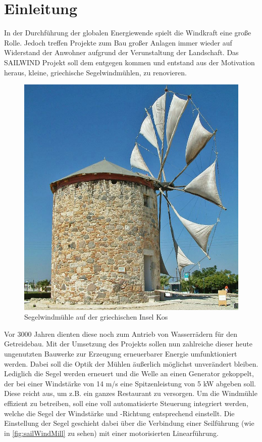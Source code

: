 \section{Einleitung}
In der Durchführung der globalen Energiewende spielt die Windkraft eine große Rolle. Jedoch treffen Projekte zum Bau großer Anlagen immer wieder auf Widerstand der Anwohner aufgrund der Verunstaltung der Landschaft. Das SAILWIND Projekt soll dem entgegen kommen und entstand aus der Motivation heraus, kleine, griechische Segelwindmühlen, zu renovieren. 
\begin{figure}[H]
	\centering
	\includegraphics[width=0.6\linewidth]{images/Sailwind/greekSailWindMill.jpg}
	\caption[Segelwindmühle auf der griechischen Insel Kos]{Segelwindmühle auf der griechischen Insel Kos \protect\cite{windMill}}
	\label{fig:sailWindMill}
\end{figure}
\noindent
Vor 3000 Jahren dienten diese noch zum Antrieb von Wasserrädern für den Getreidebau. Mit der Umsetzung des Projekts sollen nun zahlreiche dieser heute ungenutzten Bauwerke zur Erzeugung erneuerbarer Energie umfunktioniert werden. Dabei soll die Optik der Mühlen äußerlich möglichst unverändert bleiben. Lediglich die Segel werden erneuert und die Welle an einen Generator gekoppelt, der bei einer Windstärke von 14 m/s eine Spitzenleistung von 5 kW abgeben soll. Diese reicht aus, um z.B. ein ganzes Restaurant zu versorgen. \cite{industrProjektSailwind} Um die Windmühle effizient zu betreiben, soll eine voll automatisierte Steuerung integriert werden, welche die Segel der Windstärke und -Richtung entsprechend einstellt. Die Einstellung der Segel geschieht dabei über die Verbindung einer Seilführung (wie in \autoref{fig:sailWindMill} zu sehen) mit einer motorisierten Linearführung.
